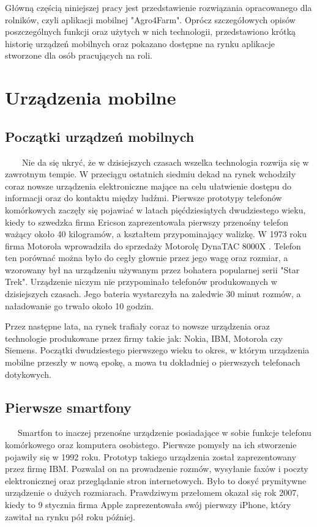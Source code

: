\documentclass[a4paper,12pt,oneside]{book}
\begin{document}
		Główną częścią niniejszej pracy jest przedstawienie rozwiązania opracowanego dla rolników, czyli aplikacji mobilnej "Agro4Farm". Oprócz szczegółowych opisów poszczególnych funkcji oraz użytych w nich technologii, przedstawiono krótką historię urządzeń mobilnych oraz pokazano dostępne na rynku aplikacje stworzone dla osób pracujących na roli.
	
	
	\newpage
	\thispagestyle{empty}
	\chapter{Urządzenia mobilne}
	\section{Początki urządzeń mobilnych}
	\ \ \ \
	Nie da się ukryć, że w dzisiejszych czasach wszelka technologia rozwija się w zawrotnym tempie. W przeciągu ostatnich siedmiu dekad na rynek wchodziły coraz nowsze urządzenia elektroniczne mające na celu ułatwienie dostępu do informacji oraz do kontaktu między ludźmi. Pierwsze prototypy telefonów komórkowych zaczęły się pojawiać w latach pięćdziesiątych dwudziestego wieku, kiedy to szwedzka firma Ericson zaprezentowała pierwszy przenośny telefon ważący około 40 kilogramów, a kształtem przypominający walizkę. W 1973 roku firma Motorola wprowadziła do sprzedaży Motorolę DynaTAC 8000X \cite{ref1}. Telefon ten porównać można było do cegły głownie przez jego wagę oraz rozmiar, a wzorowany był na urządzeniu używanym przez bohatera popularnej serii "Star Trek". Urządzenie niczym nie przypominało telefonów produkowanych w dzisiejszych czasach. Jego bateria wystarczyła na zaledwie 30 minut rozmów, a naładowanie go trwało około 10 godzin. 
	
	Przez następne lata, na rynek trafiały coraz to nowsze urządzenia oraz technologie produkowane przez firmy takie jak: Nokia, IBM, Motorola czy Siemens. Początki dwudziestego pierwszego wieku to okres, w którym urządzenia mobilne przeszły w nową epokę, a mowa tu dokładniej o pierwszych telefonach dotykowych.
	
	\section{Pierwsze smartfony}
	\ \ \ 
	Smartfon to inaczej przenośne urządzenie posiadające w sobie funkcje telefonu komórkowego oraz komputera osobistego. Pierwsze pomysły na ich stworzenie pojawiły się w 1992 roku. Prototyp takiego urządzenia został zaprezentowany przez firmę IBM. Pozwalał on na prowadzenie rozmów, wysyłanie faxów i poczty elektronicznej oraz przeglądanie stron internetowych. Było to dosyć prymitywne urządzenie o dużych rozmiarach. Prawdziwym przełomem okazał się rok 2007, kiedy to 9 stycznia firma Apple zaprezentowała swój pierwszy iPhone, który zawitał na rynku pół roku później.
	
\end{document}
